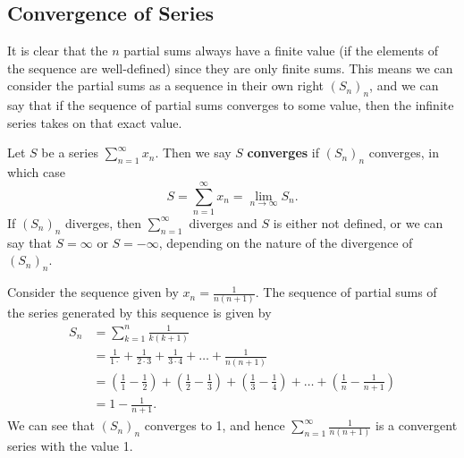 \documentclass[../real_analysis.tex]{subfiles}
\begin{document}
        \subsection{Convergence of Series}\label{subsec:convergence-of-series}
            It is clear that the $n$ partial sums always have a finite value (if the elements of the sequence are well-defined) since they are only finite sums. This means we can consider the partial sums as a sequence in their own right $(S_n)_n$, and we can say that if the sequence of partial sums converges to some value, then the infinite series takes on that exact value.
            \begin{definition}
                Let $S$ be a series $\sum_{n=1}^\infty x_n$. Then we say $S$ \textbf{converges} if $(S_n)_n$ converges, in which case
                \begin{equation}
                    S=\sum_{n=1}^\infty x_n=\lim_{n\to\infty}S_n.
                \end{equation}
                If $(S_n)_n$ diverges, then $\sum_{n=1}^\infty$ diverges and $S$ is either not defined, or we can say that $S=\infty$ or $S=-\infty$, depending on the nature of the divergence of $(S_n)_n$.
            \end{definition}
            \begin{example}
                Consider the sequence given by $x_n=\frac{1}{n(n+1)}$. The sequence of partial sums of the series generated by this sequence is given by
                \begin{align}
                    S_n&=\sum_{k=1}^n\frac{1}{k(k+1)}\\
                    &=\frac{1}{1\cdot}+\frac{1}{2\cdot3}+\frac{1}{3\cdot4}+\dots+\frac{1}{n(n+1)}\\
                    &=\left(\frac{1}{1}-\frac{1}{2}\right)+\left(\frac{1}{2}-\frac{1}{3}\right)+\left(\frac{1}{3}-\frac{1}{4}\right)+\dots+\left(\frac{1}{n}-\frac{1}{n+1}\right)\\
                    &=1-\frac{1}{n+1}.
                \end{align}
                We can see that $(S_n)_n$ converges to 1, and hence $\sum_{n=1}^\infty\frac{1}{n(n+1)}$ is a convergent series with the value 1.
            \end{example}
\end{document}
